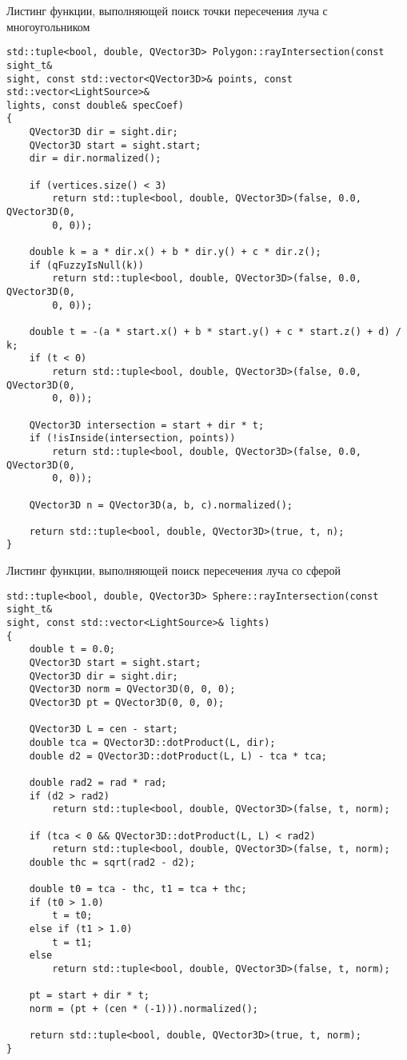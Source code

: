 \begin{code}
\caption{Листинг функции, выполняющей поиск точки пересечения луча с многоугольником}
\label{code:7}
\begin{verbatim}
std::tuple<bool, double, QVector3D> Polygon::rayIntersection(const sight_t& 
sight, const std::vector<QVector3D>& points, const std::vector<LightSource>& 
lights, const double& specCoef)
{
    QVector3D dir = sight.dir;
    QVector3D start = sight.start;
    dir = dir.normalized();

    if (vertices.size() < 3)
        return std::tuple<bool, double, QVector3D>(false, 0.0, QVector3D(0, 
        0, 0));

    double k = a * dir.x() + b * dir.y() + c * dir.z();
    if (qFuzzyIsNull(k))
        return std::tuple<bool, double, QVector3D>(false, 0.0, QVector3D(0, 
        0, 0));

    double t = -(a * start.x() + b * start.y() + c * start.z() + d) / k;
    if (t < 0)
        return std::tuple<bool, double, QVector3D>(false, 0.0, QVector3D(0, 
        0, 0));

    QVector3D intersection = start + dir * t;
    if (!isInside(intersection, points))
        return std::tuple<bool, double, QVector3D>(false, 0.0, QVector3D(0, 
        0, 0));

    QVector3D n = QVector3D(a, b, c).normalized();

    return std::tuple<bool, double, QVector3D>(true, t, n);
}
\end{verbatim}
\end{code}

\begin{code}
\caption{Листинг функции, выполняющей поиск пересечения луча со сферой}
\label{code:8}
\begin{verbatim}
std::tuple<bool, double, QVector3D> Sphere::rayIntersection(const sight_t& 
sight, const std::vector<LightSource>& lights)
{
    double t = 0.0;
    QVector3D start = sight.start;
    QVector3D dir = sight.dir;
    QVector3D norm = QVector3D(0, 0, 0);
    QVector3D pt = QVector3D(0, 0, 0);

    QVector3D L = cen - start;
    double tca = QVector3D::dotProduct(L, dir);
    double d2 = QVector3D::dotProduct(L, L) - tca * tca;

    double rad2 = rad * rad;
    if (d2 > rad2)
        return std::tuple<bool, double, QVector3D>(false, t, norm);

    if (tca < 0 && QVector3D::dotProduct(L, L) < rad2)
        return std::tuple<bool, double, QVector3D>(false, t, norm);
    double thc = sqrt(rad2 - d2);

    double t0 = tca - thc, t1 = tca + thc;
    if (t0 > 1.0)
        t = t0;
    else if (t1 > 1.0)
        t = t1;
    else
        return std::tuple<bool, double, QVector3D>(false, t, norm);

    pt = start + dir * t;
    norm = (pt + (cen * (-1))).normalized();

    return std::tuple<bool, double, QVector3D>(true, t, norm);
}
\end{verbatim}
\end{code}

